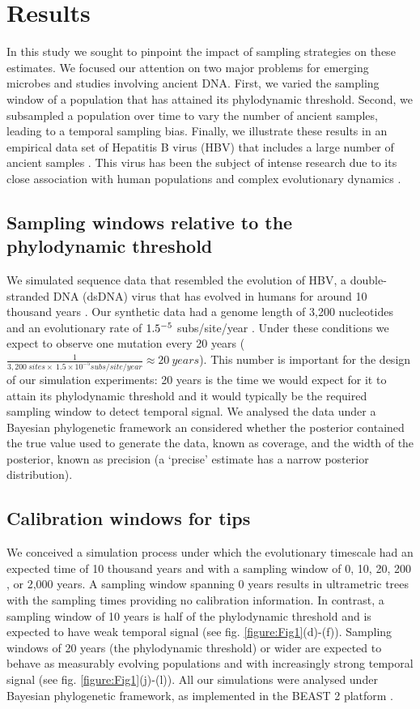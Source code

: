 \documentclass[11pt]{article}
\begin{document}
\section{Results}
In this study we sought to pinpoint the impact of sampling strategies on these estimates. We focused our attention on two major problems for emerging microbes and studies involving ancient DNA. First, we varied the sampling window of a population that has attained its phylodynamic threshold. Second, we subsampled a population over time to vary the number of ancient samples, leading to a temporal sampling bias. Finally, we illustrate these results in an empirical data set of Hepatitis B virus (HBV) that includes a large number of ancient samples \citep{kocher2021ten}. This virus has been the subject of intense research due to its close association with human populations and complex evolutionary dynamics \citep{paraskevis2013dating, ross2018paradox, kahila2012tracing}.

\subsection{Sampling windows relative to the phylodynamic threshold}
We simulated sequence data that resembled the evolution of HBV, a double-stranded DNA (dsDNA) virus that has evolved in humans for around 10 thousand years \citep{kocher2021ten}. Our synthetic data had a genome length of 3,200 nucleotides and an evolutionary rate of $1.5\time10^{-5}$ subs/site/year \citep{kocher2021ten, muhlemann2018ancient}. Under these conditions we expect to observe one mutation every 20 years ($\frac{1}{3,200\ sites \times\ 1.5\times10^{-5}subs/site/year}\approx20\ years$). This number is important for the design of our simulation experiments: 20 years is the time we would expect for it to attain its phylodynamic threshold and it would typically be the required sampling window to detect temporal signal. We analysed the data under a Bayesian phylogenetic framework an considered whether the posterior contained the true value used to generate the data, known as coverage, and the width of the posterior, known as precision (a `precise' estimate has a narrow posterior distribution).

\subsection{Calibration windows for tips}
We conceived a simulation process under which the evolutionary timescale had an expected time of 10 thousand years and with a sampling window of 0, 10, 20, 200 , or 2,000 years. A sampling window spanning 0 years results in ultrametric trees with the sampling times providing no calibration information. In contrast, a sampling window of 10 years is half of the phylodynamic threshold and is expected to have weak temporal signal (see fig. \ref{figure:Fig1}(d)-(f)). Sampling windows of 20 years (the phylodynamic threshold) or wider are expected to behave as measurably evolving populations and with increasingly strong temporal signal (see fig. \ref{figure:Fig1}(j)-(l)). All our simulations were analysed under Bayesian phylogenetic framework, as implemented in the BEAST 2 platform \citep{bouckaert2019beast}.
\end{document}
